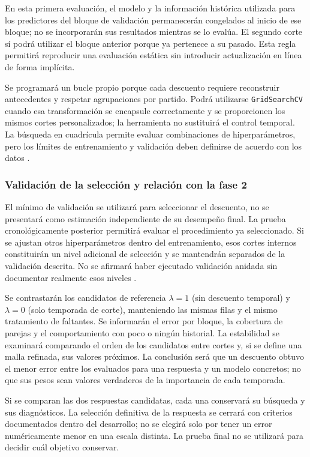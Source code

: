 En esta primera evaluación, el modelo y la información histórica utilizada para los predictores del bloque de validación permanecerán congelados al inicio de ese bloque; no se incorporarán sus resultados mientras se lo evalúa. El segundo corte sí podrá utilizar el bloque anterior porque ya pertenece a su pasado. Esta regla permitirá reproducir una evaluación estática sin introducir actualización en línea de forma implícita.

Se programará un bucle propio porque cada descuento requiere reconstruir antecedentes y respetar agrupaciones por partido. Podrá utilizarse \texttt{GridSearchCV} cuando esa transformación se encapsule correctamente y se proporcionen los mismos cortes personalizados; la herramienta no sustituirá el control temporal. La búsqueda en cuadrícula permite evaluar combinaciones de hiperparámetros, pero los límites de entrenamiento y validación deben definirse de acuerdo con los datos \cite{sklearnSearch613}.

\subsubsection*{Validación de la selección y relación con la fase 2}
El mínimo de validación se utilizará para seleccionar el descuento, no se presentará como estimación independiente de su desempeño final. La prueba cronológicamente posterior permitirá evaluar el procedimiento ya seleccionado. Si se ajustan otros hiperparámetros dentro del entrenamiento, esos cortes internos constituirán un nivel adicional de selección y se mantendrán separados de la validación descrita. No se afirmará haber ejecutado validación anidada sin documentar realmente esos niveles \cite{cawley2010selection}.

Se contrastarán los candidatos de referencia $\lambda=1$ (sin descuento temporal) y $\lambda=0$ (solo temporada de corte), manteniendo las mismas filas y el mismo tratamiento de faltantes. Se informarán el error por bloque, la cobertura de parejas y el comportamiento con poco o ningún historial. La estabilidad se examinará comparando el orden de los candidatos entre cortes y, si se define una malla refinada, sus valores próximos. La conclusión será que un descuento obtuvo el menor error entre los evaluados para una respuesta y un modelo concretos; no que sus pesos sean valores verdaderos de la importancia de cada temporada.

Si se comparan las dos respuestas candidatas, cada una conservará su búsqueda y sus diagnósticos. La selección definitiva de la respuesta se cerrará con criterios documentados dentro del desarrollo; no se elegirá solo por tener un error numéricamente menor en una escala distinta. La prueba final no se utilizará para decidir cuál objetivo conservar.

